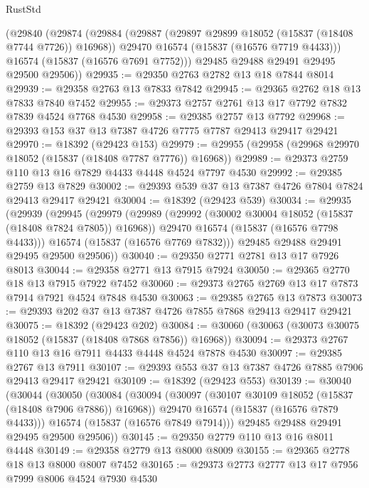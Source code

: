 \begin{lexlean}{RustStd}
\begin{coremodule}
{\begin{coremodule}
{{{{{{{{{{{{{{{{{{{{{{{{{{{{{{{{{{{{{{{{{{{{{{{{{{{{{{{{{{{{      (@29840
        (@29874
          (@29884
            (@29887 (@29897 @29899 @18052 (@15837 (@18408 @7744 @7726)) @16968))
            @29470
            @16574
            (@15837 (@16576 @7719 @4433)))
          @16574
          (@15837 (@16576 @7691 @7752)))
        @29485
        @29488
        @29491
        @29495
        @29500
        @29506))
@29935 := @29350 @2763 @2782 @13 @18 @7844 @8014
@29939 := @29358 @2763 @13 @7833 @7842
@29945 := @29365 @2762 @18 @13 @7833 @7840 @7452
@29955 := @29373 @2757 @2761 @13 @17 @7792 @7832 @7839 @4524 @7768 @4530
@29958 := @29385 @2757 @13 @7792
@29968 := @29393 @153 @37 @13 @7387 @4726 @7775 @7787 @29413 @29417 @29421
@29970 := @18392 (@29423 @153)
@29979 := @29955 (@29958 (@29968 @29970 @18052 (@15837 (@18408 @7787 @7776)) @16968))
@29989 := @29373 @2759 @110 @13 @16 @7829 @4433 @4448 @4524 @7797 @4530
@29992 := @29385 @2759 @13 @7829
@30002 := @29393 @539 @37 @13 @7387 @4726 @7804 @7824 @29413 @29417 @29421
@30004 := @18392 (@29423 @539)
@30034 := @29935
    (@29939
      (@29945
        (@29979
          (@29989
            (@29992 (@30002 @30004 @18052 (@15837 (@18408 @7824 @7805)) @16968))
            @29470
            @16574
            (@15837 (@16576 @7798 @4433)))
          @16574
          (@15837 (@16576 @7769 @7832)))
        @29485
        @29488
        @29491
        @29495
        @29500
        @29506))
@30040 := @29350 @2771 @2781 @13 @17 @7926 @8013
@30044 := @29358 @2771 @13 @7915 @7924
@30050 := @29365 @2770 @18 @13 @7915 @7922 @7452
@30060 := @29373 @2765 @2769 @13 @17 @7873 @7914 @7921 @4524 @7848 @4530
@30063 := @29385 @2765 @13 @7873
@30073 := @29393 @202 @37 @13 @7387 @4726 @7855 @7868 @29413 @29417 @29421
@30075 := @18392 (@29423 @202)
@30084 := @30060 (@30063 (@30073 @30075 @18052 (@15837 (@18408 @7868 @7856)) @16968))
@30094 := @29373 @2767 @110 @13 @16 @7911 @4433 @4448 @4524 @7878 @4530
@30097 := @29385 @2767 @13 @7911
@30107 := @29393 @553 @37 @13 @7387 @4726 @7885 @7906 @29413 @29417 @29421
@30109 := @18392 (@29423 @553)
@30139 := @30040
    (@30044
      (@30050
        (@30084
          (@30094
            (@30097 (@30107 @30109 @18052 (@15837 (@18408 @7906 @7886)) @16968))
            @29470
            @16574
            (@15837 (@16576 @7879 @4433)))
          @16574
          (@15837 (@16576 @7849 @7914)))
        @29485
        @29488
        @29491
        @29495
        @29500
        @29506))
@30145 := @29350 @2779 @110 @13 @16 @8011 @4448
@30149 := @29358 @2779 @13 @8000 @8009
@30155 := @29365 @2778 @18 @13 @8000 @8007 @7452
@30165 := @29373 @2773 @2777 @13 @17 @7956 @7999 @8006 @4524 @7930 @4530
}}}}}}}}}}}}}}}}}}}}}}}}}}}}}}}}}}}}}}}}}}}}}}}}}}}}}}}}}}}}
\end{coremodule}}
\end{coremodule}
\end{lexlean}
